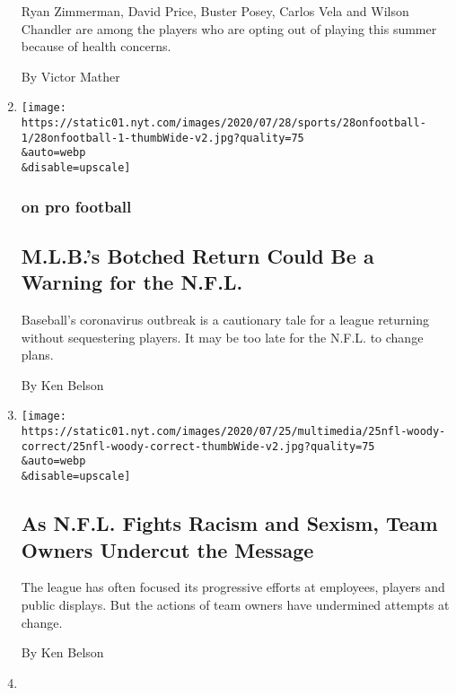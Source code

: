 \begin{enumerate}
  Ryan Zimmerman, David Price, Buster Posey, Carlos Vela and Wilson
  Chandler are among the players who are opting out of playing this
  summer because of health concerns.

  By Victor Mather
\item
  \href{/2020/07/29/sports/football/nfl-mlb-opting-out.html}{}

  \texttt{[image: https://static01.nyt.com/images/2020/07/28/sports/28onfootball-1/28onfootball-1-thumbWide-v2.jpg?quality=75\\\&auto=webp\\\&disable=upscale]}

  \hypertarget{on-pro-football}{%
  \subsubsection{on pro football}\label{on-pro-football}}

  \hypertarget{mlbs-botched-return-could-be-a-warning-for-the-nfl}{%
  \subsection{M.L.B.'s Botched Return Could Be a Warning for the
  N.F.L.}\label{mlbs-botched-return-could-be-a-warning-for-the-nfl}}

  Baseball's coronavirus outbreak is a cautionary tale for a league
  returning without sequestering players. It may be too late for the
  N.F.L. to change plans.

  By Ken Belson
\item
  \href{/2020/07/25/sports/football/woody-johnson-trump-jets.html}{}

  \texttt{[image: https://static01.nyt.com/images/2020/07/25/multimedia/25nfl-woody-correct/25nfl-woody-correct-thumbWide-v2.jpg?quality=75\\\&auto=webp\\\&disable=upscale]}

  \hypertarget{as-nfl-fights-racism-and-sexism-team-owners-undercut-the-message}{%
  \subsection{As N.F.L. Fights Racism and Sexism, Team Owners Undercut
  the
  Message}\label{as-nfl-fights-racism-and-sexism-team-owners-undercut-the-message}}

  The league has often focused its progressive efforts at employees,
  players and public displays. But the actions of team owners have
  undermined attempts at change.

  By Ken Belson
\item
  \href{/2020/07/24/sports/football/nfl-players-regular-season-start.html}{}


\end{enumerate}
